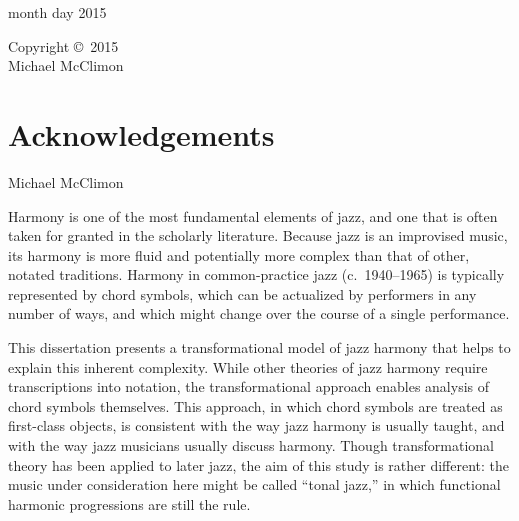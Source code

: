 {\flushleft
month day 2015
}

\clearpage

\begin{center}
  \vspace*{\fill}
  Copyright \copyright\ 2015 \\
  Michael McClimon
  \vspace*{\fill}
\end{center}
\clearpage


\section*{\Large Acknowledgements}

\clearpage


{}
\begin{center}
  Michael McClimon \\
  \vspace{0.5\baselineskip}
  {
    \MakeUppercase{\Title}
  }
\end{center}

\doublespacing

Harmony is one of the most fundamental elements of jazz, and one that is often
taken for granted in the scholarly literature. Because jazz is an improvised
music, its harmony is more fluid and potentially more complex than that of
other, notated traditions. Harmony in common-practice jazz (c.\ 1940--1965) is
typically represented by chord symbols, which can be actualized by performers
in any number of ways, and which might change over the course of a single
performance.

This dissertation presents a transformational model of jazz harmony that helps
to explain this inherent complexity. While other theories of jazz harmony
require transcriptions into notation, the transformational approach enables
analysis of chord symbols themselves. This approach, in which chord symbols
are treated as first-class objects, is consistent with the way jazz harmony is
usually taught, and with the way jazz musicians usually discuss harmony.
Though transformational theory has been applied to later jazz, the aim of this
study is rather different: the music under consideration here might be called
``tonal jazz,'' in which functional harmonic progressions are still the rule.

